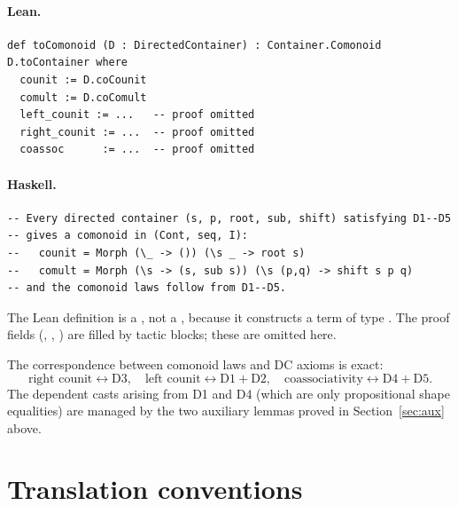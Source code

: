 \documentclass[11pt,a4paper]{article}
\begin{document}
\paragraph{Lean.}
\begin{lstlisting}[style=lean]
def toComonoid (D : DirectedContainer) : Container.Comonoid D.toContainer where
  counit := D.coCounit
  comult := D.coComult
  left_counit := ...   -- proof omitted
  right_counit := ...  -- proof omitted
  coassoc      := ...  -- proof omitted
\end{lstlisting}

\paragraph{Haskell.}
\begin{lstlisting}[style=haskell]
-- Every directed container (s, p, root, sub, shift) satisfying D1--D5
-- gives a comonoid in (Cont, seq, I):
--   counit = Morph (\_ -> ()) (\s _ -> root s)
--   comult = Morph (\s -> (s, sub s)) (\s (p,q) -> shift s p q)
-- and the comonoid laws follow from D1--D5.
\end{lstlisting}

\begin{fidelitynote}
The Lean definition is a , not a , because it constructs
a term of type .  The proof fields
(, , ) are filled by tactic
blocks; these are omitted here.

The correspondence between comonoid laws and DC axioms is exact:
\[
\text{right counit} \leftrightarrow \text{D3}, \quad
\text{left counit} \leftrightarrow \text{D1}+\text{D2}, \quad
\text{coassociativity} \leftrightarrow \text{D4}+\text{D5}.
\]
The dependent casts arising from D1 and D4 (which are only propositional shape
equalities) are managed by the two auxiliary lemmas proved in
Section~\ref{sec:aux} above.
\end{fidelitynote}


\section{Translation conventions}
\end{document}
